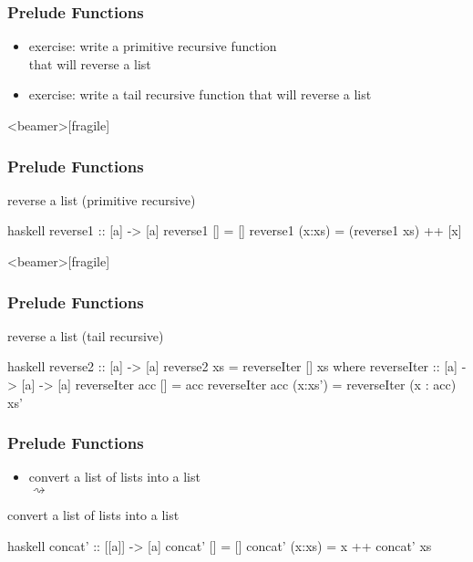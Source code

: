 \documentclass[dvipsnames]{beamer}
\theoremstyle{plain}
\begin{document}
\begin{frame}
  \frametitle{Prelude Functions}

  \begin{itemize}
    \item exercise: write a primitive recursive function\\
      that will reverse a list
    \item exercise: write a tail recursive function that will reverse a list
  \end{itemize}
\end{frame}

\begin{frame}<beamer>[fragile]
  \frametitle{Prelude Functions}

  \begin{exampleblock}{reverse a list (primitive recursive)}
    \begin{pygments}{haskell}
reverse1 :: [a] -> [a]
reverse1 [] = []
reverse1 (x:xs) = (reverse1 xs) ++ [x]
    \end{pygments}
  \end{exampleblock}
\end{frame}

\begin{frame}<beamer>[fragile]
  \frametitle{Prelude Functions}

  \begin{exampleblock}{reverse a list (tail recursive)}
    \begin{pygments}{haskell}
reverse2 :: [a] -> [a]
reverse2 xs = reverseIter [] xs
  where
    reverseIter :: [a] -> [a] -> [a]
    reverseIter acc [] = acc
    reverseIter acc (x:xs') = reverseIter (x : acc) xs'
    \end{pygments}
  \end{exampleblock}
\end{frame}

\begin{frame}[fragile]
  \frametitle{Prelude Functions}

  \begin{itemize}
    \item convert a list of lists into a list\\
      \pygment{haskell}{concat [[2, 3], [], [4]} $\rightsquigarrow$
  \end{itemize}

  \begin{exampleblock}{convert a list of lists into a list}
    \begin{pygments}{haskell}
concat' :: [[a]] -> [a]
concat' [] = []
concat' (x:xs) = x ++ concat' xs
    \end{pygments}
  \end{exampleblock}
\end{frame}
\end{document}

